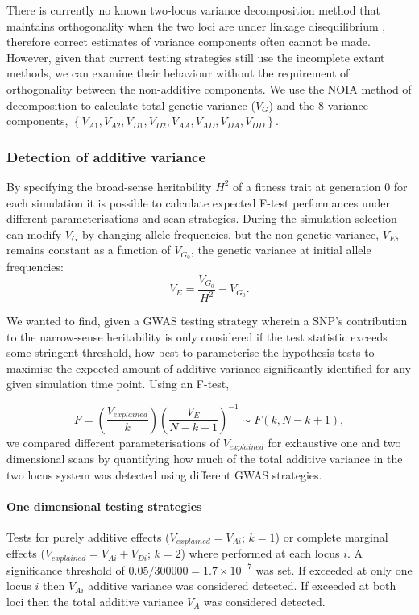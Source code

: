 There is currently no known two-locus variance decomposition method that maintains orthogonality when the two loci are under linkage disequilibrium \citep{Alvarez-Castro2007}, therefore correct estimates of variance components often cannot be made. However, given that current testing strategies still use the incomplete extant methods, we can examine their behaviour without the requirement of orthogonality between the non-additive components. We use the NOIA method of decomposition \citep{Alvarez-Castro2007} to calculate total genetic variance ($V_G$) and the 8 variance components, $\left\{V_{A1},V_{A2},V_{D1},V_{D2},V_{AA},V_{AD},V_{DA},V_{DD}\right\}$.

\subsubsection{Detection of additive variance}

By specifying the broad-sense heritability $H^2$ of a fitness trait at generation 0 for each simulation it is possible to calculate expected F-test performances under different parameterisations and scan strategies. During the simulation selection can modify $V_G$ by changing allele frequencies, but the non-genetic variance, $V_E$, remains constant as a function of $V_{G_0}$, the genetic variance at initial allele frequencies:
\begin{equation}
V_E = \frac{V_{G_0}}{H^2} - V_{G_0}.\label{calcve}
\end{equation}

We wanted to find, given a GWAS testing strategy wherein a SNP's contribution to the narrow-sense heritability is only considered if the test statistic exceeds some stringent threshold, how best to parameterise the hypothesis tests to maximise the expected amount of additive variance significantly identified for any given simulation time point. Using an F-test,

\begin{equation}
F = \left(\frac{V_{explained}}{k}\right)\left(\frac{V_E}{N-k+1}\right)^{-1} \sim F(k,N-k+1),
\end{equation}
we compared different parameterisations of $V_{explained}$ for exhaustive one and two dimensional scans by quantifying how much of the total additive variance in the two locus system was detected using different GWAS strategies.

\paragraph{One dimensional testing strategies}
Tests for purely additive effects ($V_{explained} = V_{Ai}$; $k = 1$) or complete marginal effects ($V_{explained} = V_{Ai}+V_{Di}$; $k = 2$) where performed at each locus $i$. A significance threshold of $0.05/300000=1.7\times10^{-7}$ was set. If exceeded at only one locus $i$ then $V_{Ai}$ additive variance was considered detected. If exceeded at both loci then the total additive variance $V_A$ was considered detected.

